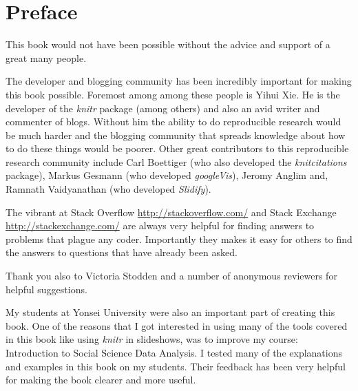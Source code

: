 


\chapter*{Preface}


\noindent This book would not have been possible without the advice and support of a great many people.

The developer and blogging community has been incredibly important for making this book possible. Foremost among among these people is Yihui Xie. He is the developer of the {\emph{knitr}} package (among others) and also an avid writer and commenter of blogs. Without him the ability to do reproducible research would be much harder and the blogging community that spreads knowledge about how to do these things would be poorer. Other great contributors to this reproducible research community include Carl Boettiger (who also developed the {\emph{knitcitations}} package), Markus Gesmann (who developed {\emph{googleVis}}), Jeromy Anglim and, Ramnath Vaidyanathan (who developed {\emph{Slidify}}).

The vibrant at Stack Overflow \url{http://stackoverflow.com/} and Stack Exchange \url{http://stackexchange.com/} are always very helpful for finding answers to problems that plague any coder. Importantly they makes it easy for others to find the answers to questions that have already been asked.

Thank you also to Victoria Stodden and a number of anonymous reviewers for helpful suggestions.

My students at Yonsei University were also an important part of creating this book. One of the reasons that I got interested in using many of the tools covered in this book like using {\emph{knitr}} in slideshows, was to improve my course: Introduction to Social Science Data Analysis. I tested many of the explanations and examples in this book on my students. Their feedback has been very helpful for making the book clearer and more useful.
